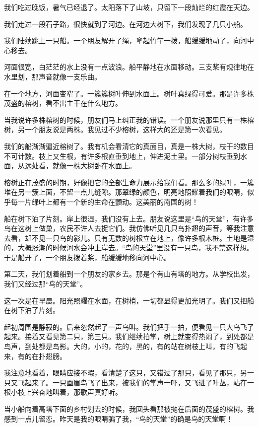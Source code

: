 \documentclass[12pt,UTF-8,openany]{ctexbook}
\begin{document}
\begin{large}
    
    我们吃过晚饭，暑气已经退了。太阳落下了山坡，只留下一段灿烂的红霞在天边。
    
    我们走过一段石子路，很快就到了河边。在河边大树下，我们发现了几只小船。
    
    我们陆续跳上一只船。一个朋友解开了绳，拿起竹竿一拨，船缓缓地动了，向河中心移去。
    
    河面很宽，白茫茫的水上没有一点波浪。船平静地在水面移动。三支桨有规律地在水里划，那声音就像一支乐曲。
    
    在一个地方，河面变窄了。一簇簇树叶伸到水面上。树叶真绿得可爱。那是许多株茂盛的榕树，看不出主干在什么地方。
    
    当我说许多株榕树的时候，朋友们马上纠正我的错误。一个朋友说那里只有一株榕树，另一个朋友说是两株。我见过不少榕树，这样大的还是第一次看见。
    
    我们的船渐渐逼近榕树了。我有机会看清它的真面目，真是一株大树，枝干的数目不可计数。枝上又生根，有许多根直垂到地上，伸进泥土里。一部分树枝垂到水面，从远处看，就像一株大树卧在水面上。
    
    榕树正在茂盛的时期，好像把它的全部生命力展示给我们看。那么多的绿叶，一簇堆在另一簇上面，不留一点儿缝隙。那翠绿的颜色，明亮地照耀着我们的眼睛，似乎每一片绿叶上都有一个新的生命在颤动。这美丽的南国的树！
    
    船在树下泊了片刻。岸上很湿，我们没有上去。朋友说这里是“鸟的天堂”，有许多鸟在这树上做巢，农民不许人去捉它们。我仿佛听见几只鸟扑翅的声音，等我注意去看，却不见一只鸟的影儿。只有无数的树根立在地上，像许多根木桩。土地是湿的，大概涨潮的时候河水会冲上岸去。“鸟的天堂”里没有一只鸟，我不禁这样想。于是船开了，一个朋友拨着桨，船缓缓地移向河中心。
    
    第二天，我们划着船到一个朋友的家乡去。那是个有山有塔的地方。从学校出发，我们又经过那“鸟的天堂”。
    
    这一次是在早晨。阳光照耀在水面，在树梢，一切都显得更加光明了。我们又把船在树下泊了片刻。
    
    起初周围是静寂的。后来忽然起了一声鸟叫。我们把手一拍，便看见一只大鸟飞了起来。接着又看见第二只，第三只。我们继续拍掌，树上就变得热闹了，到处都是鸟声，到处都是鸟影。大的，小的，花的，黑的，有的站在树枝上叫，有的飞起来，有的在扑翅膀。
    
    我注意地看着，眼睛应接不暇，看清楚了这只，又错过了那只，看见了那只，另一只又飞起来了。一只画眉鸟飞了出来，被我们的掌声一吓，又飞进了叶丛，站在一根小枝上兴奋地叫着，那歌声真好听。
    
    当小船向着高塔下面的乡村划去的时候，我回头看那被抛在后面的茂盛的榕树。我感到一点儿留恋。昨天是我的眼睛骗了我，“鸟的天堂”的确是鸟的天堂啊！
    
\end{large}
\end{document}
